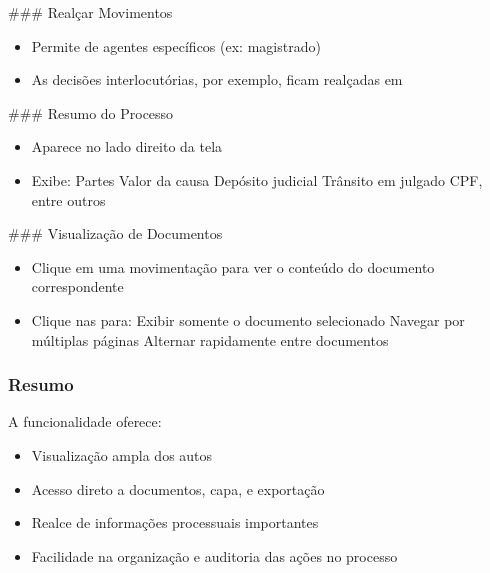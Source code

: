 \documentclass[letterpaper,10pt,brazil]{sphinxmanual}
\begin{document}
\sphinxAtStartPar
\#\#\# Realçar Movimentos
\begin{itemize}
\item {} 
\sphinxAtStartPar
Permite  de agentes específicos (ex: magistrado)

\item {} 
\sphinxAtStartPar
As decisões interlocutórias, por exemplo, ficam realçadas em 

\end{itemize}

\sphinxAtStartPar
\#\#\# Resumo do Processo
\begin{itemize}
\item {} 
\sphinxAtStartPar
Aparece no lado direito da tela

\item {} 
\sphinxAtStartPar
Exibe:
\sphinxhyphen{} Partes
\sphinxhyphen{} Valor da causa
\sphinxhyphen{} Depósito judicial
\sphinxhyphen{} Trânsito em julgado
\sphinxhyphen{} CPF, entre outros

\end{itemize}

\sphinxAtStartPar
\#\#\# Visualização de Documentos
\begin{itemize}
\item {} 
\sphinxAtStartPar
Clique em uma movimentação para ver o conteúdo do documento correspondente

\item {} 
\sphinxAtStartPar
Clique nas  para:
\sphinxhyphen{} Exibir somente o documento selecionado
\sphinxhyphen{} Navegar por múltiplas páginas
\sphinxhyphen{} Alternar rapidamente entre documentos

\end{itemize}


\subsubsection{Resumo}
\label{\detokenize{projud_16_navegandoprocessos:resumo}}
\sphinxAtStartPar
A funcionalidade  oferece:
\begin{itemize}
\item {} 
\sphinxAtStartPar
Visualização ampla dos autos

\item {} 
\sphinxAtStartPar
Acesso direto a documentos, capa, e exportação

\item {} 
\sphinxAtStartPar
Realce de informações processuais importantes

\item {} 
\sphinxAtStartPar
Facilidade na organização e auditoria das ações no processo

\end{itemize}
\end{document}

